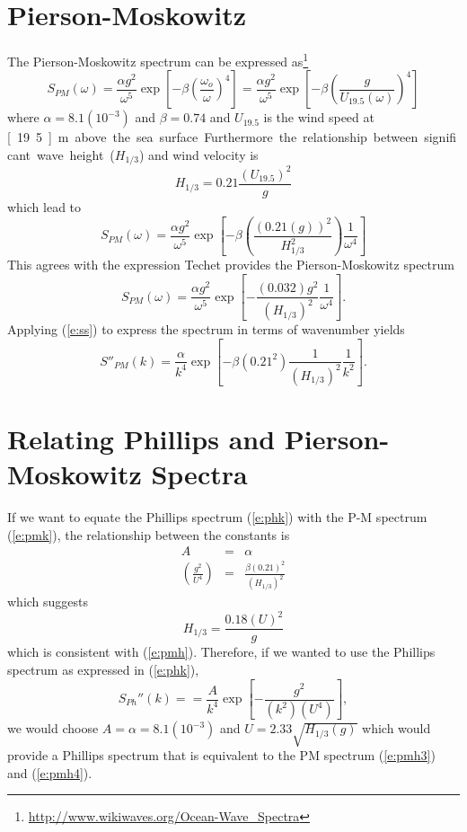\documentclass[11pt]{article}
\begin{document}
\section{Pierson-Moskowitz}
The Pierson-Moskowitz spectrum can be expressed as\footnote{\url{http://www.wikiwaves.org/Ocean-Wave_Spectra}}
\begin{equation}
S_{PM}(\omega)=\frac{\alpha g^2}{\omega^5} \exp{\left[ -\beta \left(\frac{\omega_o}{\omega}\right)^4 \right]} =\frac{\alpha g^2}{\omega^5} \exp{\left[ -\beta \left(\frac{g}{U_{19.5}(\omega)}\right)^4 \right]}
\end{equation}
where $\alpha=8.1(10^{-3})$ and $\beta=0.74$ and $U_{19.5}$ is the wind speed at \unit[19.5]{m} above the sea surface.  Furthermore the relationship between significant wave height ($H_{1/3}$) and wind velocity is
\begin{equation}
H_{1/3} = 0.21 \frac{\left(U_{19.5}\right)^2}{g}
\label{e:pmh}
\end{equation}
which lead to 
\begin{equation}
S_{PM}(\omega)=\frac{\alpha g^2}{\omega^5} \exp{\left[ -\beta \left(\frac{(0.21(g))^2}{H_{1/3}^2}\right) \frac{1}{\omega^4} \right]}
\label{e:pmh3}
\end{equation}
This agrees with the expression Techet provides the Pierson-Moskowitz spectrum 
\begin{equation}
S_{PM}(\omega)=\frac{\alpha g^2}{\omega^5} \exp{\left[ - \frac{(0.032)g^2}{\left(H_{1/3}\right)^2} \frac{1}{\omega^4} \right]}.
\label{e:pmh4}
\end{equation} 
Applying (\ref{e:ss}) to express the spectrum in terms of wavenumber yields
\begin{equation}
S''_{PM}(k) = \frac{\alpha}{k^4} \exp{\left[ -\beta (0.21^2) \frac{1}{(H_{1/3})^2}\frac{1}{k^2} \right]}.
\label{e:pmk}
\end{equation}

\section{Relating Phillips and Pierson-Moskowitz Spectra}
If we want to equate the Phillips spectrum (\ref{e:phk}) with the P-M spectrum  (\ref{e:pmk}), the relationship between the constants is
\begin{eqnarray}
A & = & \alpha \\
\left(\frac{g^2}{U^4}\right) & = & \frac{\beta (0.21)^2}{\left(H_{1/3}\right)^2}
\end{eqnarray}
which suggests
\begin{equation}
H_{1/3}=\frac{0.18 (U)^2}{g}
\label{e:phh}
\end{equation}
which is consistent with (\ref{e:pmh}).  Therefore, if we wanted to use the Phillips spectrum as expressed in (\ref{e:phk}),
\begin{equation} 
S_{Ph}''(k)= 
= \frac{A}{k^4} \exp{\left[ - \frac{g^2}{(k^2)(U^4)} \right]},
\end{equation}
we would choose $A=\alpha=8.1(10^{-3})$ and $U=2.33\sqrt{H_{1/3}(g)}$ which would provide a Phillips spectrum that is equivalent to the PM spectrum (\ref{e:pmh3}) and (\ref{e:pmh4}).
\newpage
\setcounter{page}{1}


\end{document}
